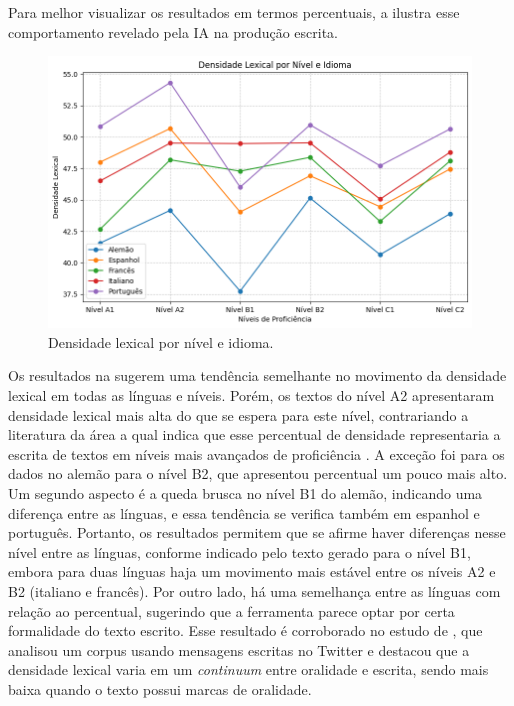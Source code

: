 \documentclass[portuguese]{textolivre}
\begin{document}
Para melhor visualizar os resultados em termos percentuais, a  ilustra esse comportamento revelado pela IA na produção escrita.

\begin{figure}[h!]
    \centering
    \includegraphics[width=0.8\linewidth]{Fig8.png}
    \caption{Densidade lexical por nível e idioma.}
    \label{fig8}
\end{figure}

Os resultados na  sugerem uma tendência semelhante no movimento da densidade lexical em todas as línguas e níveis. Porém, os textos do nível A2 apresentaram densidade lexical mais alta do que se espera para este nível, contrariando a literatura da área a qual indica que esse percentual de densidade representaria a escrita de textos em níveis mais avançados de proficiência \cite{gregori-signes_analysing_2015,clavel-arroitia_analysing_2021}. A exceção foi para os dados no alemão para o nível B2, que apresentou percentual um pouco mais alto. Um segundo aspecto é a queda brusca no nível B1 do alemão, indicando uma diferença entre as línguas, e essa tendência se verifica também em espanhol e português. Portanto, os resultados permitem que se afirme haver diferenças nesse nível entre as línguas, conforme indicado pelo texto gerado para o nível B1, embora para duas línguas haja um movimento mais estável entre os níveis A2 e B2 (italiano e francês). Por outro lado, há uma semelhança entre as línguas com relação ao percentual, sugerindo que a ferramenta parece optar por certa formalidade do texto escrito. Esse resultado é corroborado no estudo de \textcite{gonzalez_fernandez_big_2018}, que analisou um corpus usando mensagens escritas no Twitter e destacou que a densidade lexical varia em um \textit{continuum} entre oralidade e escrita, sendo mais baixa quando o texto possui marcas de oralidade. 
\end{document}
